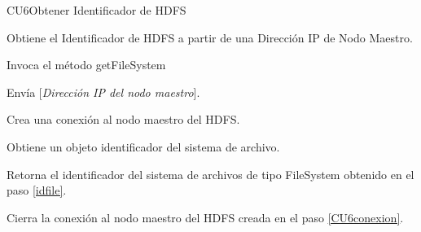 \begin{UseCase}{CU6}{Obtener Identificador de HDFS}{

Obtiene el Identificador de HDFS a partir de una Dirección IP de Nodo Maestro.

}















\end{UseCase}


\begin{UCtrayectoria}

\UCpaso[\UCactor] Invoca el método getFileSystem

\UCpaso[\UCactor] Envía [{\em Dirección IP del nodo maestro}].

\UCpaso[\UCsist] Crea una conexión al nodo maestro del HDFS. \label{CU6conexion}

\UCpaso[\UCsist] Obtiene un objeto identificador del sistema de archivo. \label{idfile}

\UCpaso[\UCsist] Retorna el identificador del sistema de archivos de tipo FileSystem obtenido en el paso \ref{idfile}.

\UCpaso[\UCsist] Cierra la conexión al nodo maestro del HDFS creada en el paso \ref{CU6conexion}.

\end{UCtrayectoria}




